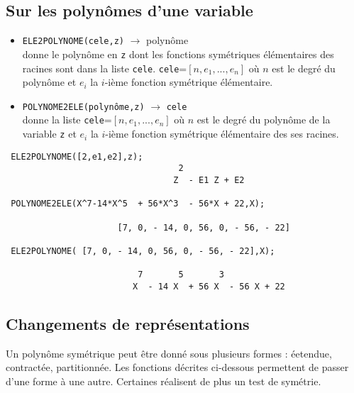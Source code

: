 \documentclass[11pt]{article}
\begin{document}
\subsection{Sur les polyn\^omes d'une variable}
  \begin{itemize}
    \item {\tt ELE2POLYNOME(cele,z)} 
$\longrightarrow$ polyn\^ome\\
donne le polyn\^ome en {\tt z} dont les fonctions
sym\'etriques \'el\'ementaires des racines sont dans la liste {\tt cele}.
{\tt cele}=$[n,e_1,...,e_n]$ o\`u $n$ est le degr\'e du polyn\^ome et
$e_i$ la $i$-i\`eme fonction sym\'etrique \'el\'ementaire.

     \item {\tt POLYNOME2ELE(polyn\^ome,z)} 
$\longrightarrow$ {\tt cele}\\
 donne la liste {\tt cele}=$[n,e_1,...,e_n]$ o\`u $n$ est le
degr\'e du polyn\^ome de la variable {\tt z}
et $e_i$ la $i$-i\`eme fonction sym\'etrique 
\'el\'ementaire des ses racines.
\end{itemize}
\small
\begin{verbatim}
 ELE2POLYNOME([2,e1,e2],z);
                                  2
                                 Z  - E1 Z + E2

 POLYNOME2ELE(X^7-14*X^5  + 56*X^3  - 56*X + 22,X);
 
                      [7, 0, - 14, 0, 56, 0, - 56, - 22] 

 ELE2POLYNOME( [7, 0, - 14, 0, 56, 0, - 56, - 22],X);

                          7       5       3
                         X  - 14 X  + 56 X  - 56 X + 22
\end{verbatim}
\normalsize
\subsection{Changements de repr\'esentations}
Un polyn\^ome sym\'etrique peut \^etre donn\'e sous plusieurs formes :
\'eetendue, contract\'ee, partitionn\'ee. Les fonctions d\'ecrites ci-dessous
permettent de passer d'une forme \`a une autre. Certaines r\'ealisent de plus
un test de sym\'etrie.
\end{document}
